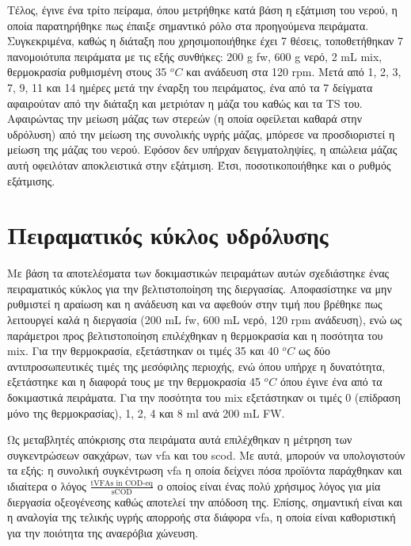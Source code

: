 \documentclass[11pt]{report}
\begin{document}
Τέλος, έγινε ένα τρίτο πείραμα, όπου μετρήθηκε κατά βάση η εξάτμιση του νερού, η οποία παρατηρήθηκε πως έπαιξε σημαντικό ρόλο στα προηγούμενα πειράματα. Συγκεκριμένα, καθώς η διάταξη που χρησιμοποιήθηκε έχει 7 θέσεις, τοποθετήθηκαν 7 πανομοιότυπα πειράματα με τις εξής συνθήκες: 200 g \acrshort{fw}, 600 g νερό, 2 mL \acrshort{mix}, θερμοκρασία ρυθμισμένη στους 35 \(^oC\) και ανάδευση στα 120 rpm. Μετά από 1, 2, 3, 7, 9, 11 και 14 ημέρες μετά την έναρξη του πειράματος, ένα από τα 7 δείγματα αφαιρούταν από την διάταξη και μετριόταν η μάζα του καθώς και τα TS του. Αφαιρώντας την μείωση μάζας των στερεών (η οποία οφείλεται καθαρά στην υδρόλυση) από την μείωση της συνολικής υγρής μάζας, μπόρεσε να προσδιοριστεί η μείωση της μάζας του νερού. Εφόσον δεν υπήρχαν δειγματοληψίες, η απώλεια μάζας αυτή οφειλόταν αποκλειστικά στην εξάτμιση. Έτσι, ποσοτικοποιήθηκε και ο ρυθμός εξάτμισης.

\section{Πειραματικός κύκλος υδρόλυσης}
\label{sec:org209a63b}
\label{sec:lab-hydro}
Με βάση τα αποτελέσματα των δοκιμαστικών πειραμάτων αυτών σχεδιάστηκε ένας πειραματικός κύκλος για την βελτιστοποίηση της διεργασίας. Αποφασίστηκε να μην ρυθμιστεί η αραίωση και η ανάδευση και να αφεθούν στην τιμή που βρέθηκε πως λειτουργεί καλά η διεργασία (200 mL \acrshort{fw}, 600 mL νερό, 120 rpm ανάδευση), ενώ ως παράμετροι προς βελτιστοποίηση επιλέχθηκαν η θερμοκρασία και η ποσότητα του \acrshort{mix}. Για την θερμοκρασία, εξετάστηκαν οι τιμές 35 και 40 \(^oC\) ως δύο αντιπροσωπευτικές τιμές της μεσόφιλης περιοχής, ενώ όπου υπήρχε η δυνατότητα, εξετάστηκε και η διαφορά τους με την θερμοκρασία 45 \(^oC\) όπου έγινε ένα από τα δοκιμαστικά πειράματα. Για την ποσότητα του \acrshort{mix} εξετάστηκαν οι τιμές 0 (επίδραση μόνο της θερμοκρασίας), 1, 2, 4 και 8 ml ανά 200 mL FW. 

Ως μεταβλητές απόκρισης στα πειράματα αυτά επιλέχθηκαν η μέτρηση των συγκεντρώσεων σακχάρων, των \acrshort{vfa} και του \acrshort{scod}.  Με αυτά, μπορούν να υπολογιστούν τα εξής: η συνολική συγκέντρωση \acrshort{vfa} η οποία δείχνει πόσα προϊόντα παράχθηκαν και ιδιαίτερα ο λόγος \(\frac{\text{tVFAs in COD-eq}}{\text{sCOD}}\) ο οποίος είναι ένας πολύ χρήσιμος λόγος για μία διεργασία οξεογένεσης καθώς αποτελεί την απόδοση της. Επίσης, σημαντική είναι και η αναλογία της τελικής υγρής απορροής στα διάφορα \acrshort{vfa}, η οποία είναι καθοριστική για την ποιότητα της αναερόβια χώνευση.
\end{document}
